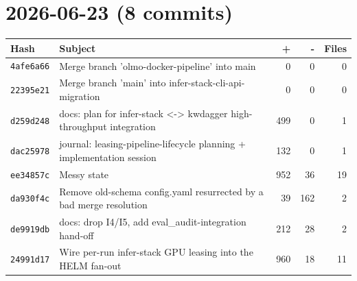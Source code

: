 \section*{2026-06-23 (8 commits)}
\begin{longtable}{@{}p{}p{}r r r@{}}
\toprule Hash & Subject & + & - & Files \\ \midrule\endhead
\texttt{4afe6a66} & Merge branch 'olmo-docker-pipeline' into main & 0 & 0 & 0 \\
\texttt{22395e21} & Merge branch 'main' into infer-stack-cli-api-migration & 0 & 0 & 0 \\
\texttt{d259d248} & docs: plan for infer-stack <-> kwdagger high-throughput integration & 499 & 0 & 1 \\
\texttt{dac25978} & journal: leasing-pipeline-lifecycle planning + implementation session & 132 & 0 & 1 \\
\texttt{ee34857c} & Messy state & 952 & 36 & 19 \\
\texttt{da930f4c} & Remove old-schema config.yaml resurrected by a bad merge resolution & 39 & 162 & 2 \\
\texttt{de9919db} & docs: drop I4/I5, add eval\_audit-integration hand-off & 212 & 28 & 2 \\
\texttt{24991d17} & Wire per-run infer-stack GPU leasing into the HELM fan-out & 960 & 18 & 11 \\
\bottomrule\end{longtable}
